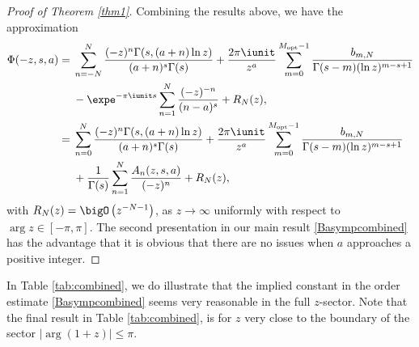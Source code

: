\begin{proof}[Proof of Theorem \ref{thm1}]
Combining the results above, we have the approximation
\begin{align}
 \Phi(-z,s,a)={}&
 \sum_{n=-N}^N \frac{(-z)^n \Gamma(s,(a+n)\ln z)}{(a+n)^s\Gamma(s)}
 +\frac{2\pi\iunit}{z^{a}}\sum_{m=0}^{M_{\rm opt}-1}
 \frac{b_{m,N}}{\Gamma(s-m)(\ln z)^{m-s+1}}\nonumber\\
 & -\expe^{-\pi\iunit s}\sum_{n=1}^N\frac{(-z)^{-n}}{(n-a)^s}
 +R_N(z),\nonumber\\
 ={}& \sum_{n=0}^N \frac{(-z)^n \Gamma(s,(a+n)\ln z)}{(a+n)^s\Gamma(s)}
 +\frac{2\pi\iunit}{z^{a}}\sum_{m=0}^{M_{\rm opt}-1}
 \frac{b_{m,N}}{\Gamma(s-m)(\ln z)^{m-s+1}}\nonumber\\
 & +\frac1{\Gamma(s)}\sum_{n=1}^N \frac{A_n(z,s,a)}{(-z)^n}+R_N(z),\label{Basympcombined}
\end{align}
with $R_N(z)=\bigO\left(z^{-N-1}\right)$, as $z\to\infty$ uniformly with respect to
$\arg z\in[-\pi,\pi]$. The second presentation in our main result \eqref{Basympcombined} has
the advantage that it is obvious that there are no issues when $a$ approaches a positive integer.
\end{proof}

In Table \ref{tab:combined}, we do illustrate that the implied constant in the order
estimate \eqref{Basympcombined} seems very reasonable in the full $z$-sector.
Note that the final result in Table \ref{tab:combined}, is for $z$ very close to
the boundary of the sector $|\arg(1+z)|\leq\pi$.

